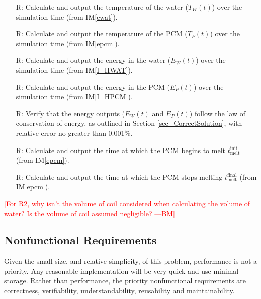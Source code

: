 \documentclass[12pt]{article}
\newcommand{\authornote}[3]{\textcolor{#1}{[#3 ---#2]}}
\newcommand{\authornote}[3]{}
\newcommand{\bmac}[1]{\authornote{red}{BM}{#1}}
\newcommand{\iref}[1]{IM\ref{#1}}
\newcounter{reqnum} %
\begin{document}
\begin{itemize}
\item[R\refstepcounter{reqnum}\thereqnum \label{R_TempWater}:] Calculate and
  output the temperature of the water ($T_W(t)$) over the simulation time  (from
  \iref{ewat}).

\item[R\refstepcounter{reqnum}\thereqnum \label{R_TempPCM}:] Calculate and
  output the temperature of the PCM ($T_P(t)$) over the simulation time (from
  \iref{epcm}).

\item[R\refstepcounter{reqnum}\thereqnum \label{R_EnergyWater}:] Calculate and
  output the energy in the water ($E_W(t)$) over the simulation time (from
  \iref{I_HWAT}).

\item[R\refstepcounter{reqnum}\thereqnum \label{R_EnergyPCM}:] Calculate and
  output the energy in the PCM ($E_P(t)$) over the simulation time (from
  \iref{I_HPCM}).
  
\item[R\refstepcounter{reqnum}\thereqnum \label{R_VerifyOutput}:] Verify that the
  energy outputs ($E_W(t)$ and $E_P(t)$) follow the law of conservation of energy, 
  as outlined in Section \ref{sec_CorrectSolution}, with relative error no greater 
  than 0.001\%.

\item[R\refstepcounter{reqnum}\thereqnum \label{R_timeMeltBegin}:] Calculate and
  output the time at which the PCM begins to melt $t_\text{melt}^\text{init}$
  (from \iref{epcm}).

\item[R\refstepcounter{reqnum}\thereqnum \label{R_timeMeltEnd}:] Calculate and
  output the time at which the PCM stops melting $t_\text{melt}^\text{final}$
  (from \iref{epcm}).

\end{itemize}

\bmac{For R2, why isn't the volume of coil considered when calculating the volume of water? Is the volume of coil assumed negligible?}

\subsection{Nonfunctional Requirements}

Given the small size, and relative simplicity, of this problem, performance is
not a priority.  Any reasonable implementation will be very quick and use
minimal storage.  Rather than performance, the priority nonfunctional
requirements are correctness, verifiability, understandability, reusability and
maintainability.
\end{document}
